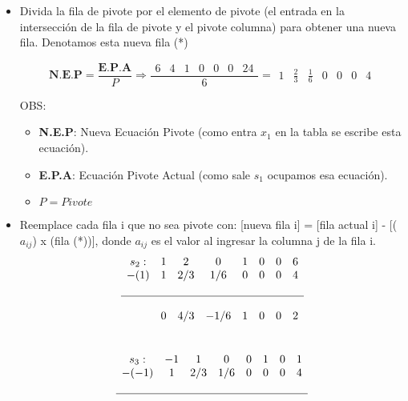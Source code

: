 \documentclass{templateNote}
\begin{document}
\begin{itemize}
    \item Divida la fila de pivote por el elemento de pivote (el entrada en la intersección de la fila de pivote y el pivote columna) para obtener una nueva fila. Denotamos esta nueva fila (*)
    \begin{center}
        \begin{equation*}
            \textbf{N.E.P} = \frac{\textbf{E.P.A}}{P} \Rightarrow \frac{\begin{array}{ccccccc} 6 & 4 & 1 & 0 & 0 & 0 & 24\end{array}}{6} = \begin{array}{ccccccc} 1 & \frac{2}{3} & \frac{1}{6} & 0 & 0 & 0 & 4 \end{array}
        \end{equation*}
    \end{center}
        OBS:
        \begin{itemize}
            \item \textbf{N.E.P}: Nueva Ecuación Pivote (como entra $x_1$ en la tabla se escribe esta ecuación).
            \item \textbf{E.P.A}: Ecuación Pivote Actual (como sale $s_1$ ocupamos esa ecuación).
            \item $P = Pivote$
        \end{itemize}
    \item Reemplace cada fila i que no sea pivote con: [nueva fila i] = [fila actual i] - [($a_{ij}$) x (fila (*))], donde  $a_{ij}$ es el valor al ingresar la columna j de la fila i.
    \begin{equation*}
        \begin{array}{cccccccc}
            s_2: & 1 & 2 & 0 & 1 & 0 & 0 & 6 \\
            -(1) & 1 & 2/3 & 1/6 & 0 & 0 & 0 & 4 \\
            \\ \hline \\
            & 0 & 4/3 & -1/6 & 1 & 0 & 0 & 2
        \end{array}
    \end{equation*}
    \\
    \begin{equation*}
        \begin{array}{cccccccc}
            s_3: & -1 & 1 & 0 & 0 & 1 & 0 & 1 \\
            -(-1) & 1 & 2/3 & 1/6 & 0 & 0 & 0 & 4 \\
            \\ \hline \\

\end{array}
\end{equation*}
\end{itemize}
\end{document}
